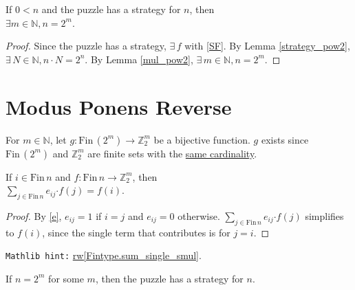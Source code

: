 \documentclass[11pt]{amsart}
\newcommand{\Zz}{\mathbb{Z}_2}
\newcommand{\Fin}{\mathrm{Fin}\,}
\begin{document}
\bigskip

\begin{theorem}
\label{puzzle_mp} If $0 < n$ and the puzzle has a strategy for $n$, then\\ $\exists m\in\mathbb{N}, n = 2^m$.
\end{theorem}

\begin{proof}
Since the puzzle has a strategy, $\exists\,f$ with \eqref{SF}. By Lemma \ref{strategy_pow2}, $\exists\,N\in\mathbb{N}, n\cdot N = 2^n$. By Lemma \ref{mul_pow2}, $\exists\,m\in\mathbb{N}, n = 2^m$.
\end{proof}

\bigskip

\section{Modus Ponens Reverse}

\bigskip

\begin{definition}
\label{bij_Fin} For $m\in\mathbb{N}$, let $g : \Fin (2^m) \to \Zz^m$ be a bijective function. $g$ exists since $\Fin (2^m)$ and $\Zz^m$ are finite sets with the \href{https://leanprover-community.github.io/mathlib4_docs/Mathlib/Data/Fintype/EquivFin.html#Fintype.equivOfCardEq}{same cardinality}.
\end{definition}

\bigskip

\begin{lemma}
\label{sum_basis} If $i \in \Fin n$ and $f : \Fin n \to \Zz^m$, then\\ $\displaystyle\sum_{j \in \Fin n} e_{ij} \boldsymbol{\cdot} f(j) = f(i)$.
\end{lemma}

\begin{proof}
By \eqref{e}, $e_{ij} = 1$ if $i = j$ and $e_{ij} = 0$ otherwise.  $\sum_{j \in \Fin n} e_{ij} \boldsymbol{\cdot} f(j)$ simplifies to $f(i)$, since the single term that contributes is for $j = i$.
\end{proof}

\verb|Mathlib hint:| \href{https://leanprover-community.github.io/mathlib4_docs/Mathlib/Algebra/Module/BigOperators.html#Fintype.sum_single_smul}{rw[Fintype.sum\_single\_smul]}.

\bigskip

\begin{theorem}
\label{puzzle_mpr} If $n = 2^m$ for some $m$, then the puzzle has a strategy for $n$.
\end{theorem}
\end{document}
